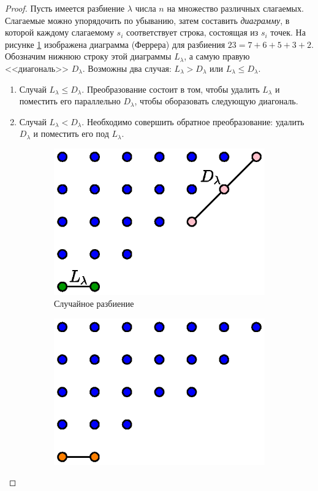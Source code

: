\documentclass[a5paper]{article}
\theoremstyle{definition}
\begin{document}
\begin{proof}
	Пусть имеется разбиение \( \lambda \) числа \( n \) на множество различных 
	слагаемых. 
	Слагаемые можно упорядочить по убыванию, затем составить 
	\textit{диаграмму}, в которой каждому слагаемому \( s_i \) соответствует 
	строка, состоящая из \( s_i \) точек. На рисунке \ref{fig:ferrer_1} 
	изображена диаграмма (Феррера) для разбиения \( 23 = 7+6+5+3+2 \). 
	Обозначим нижнюю строку этой диаграммы \( L_{\lambda} \), а самую правую 
	<<диагональ>> \( D_{\lambda} \). Возможны два случая: \( L_{\lambda} > 
	D_{\lambda} \) или \( L_{\lambda} \leq D_{\lambda} \).
	\begin{enumerate}
	\item Случай \( L_{\lambda} \leq D_{\lambda} \). Преобразование состоит в 
	том, чтобы удалить \( L_{\lambda} \) и поместить его параллельно \( 
	D_{\lambda} \), чтобы оборазовать следующую диагональ.
	\item Случай \( L_{\lambda} < D_{\lambda} \). Необходимо совершить обратное 
	преобразование: удалить \( D_{\lambda} \) и поместить его под \( 
	L_{\lambda} \).
	\end{enumerate}
\begin{figure}[h]
\centering
\begin{subfigure}{.33\textwidth}
	\centering
	\includegraphics[width=.8\textwidth]{ferrer_1}
	\caption{Случайное разбиение}
	\label{fig:ferrer_1}	
\end{subfigure}%
\begin{subfigure}{.33\textwidth}
	\centering
	\includegraphics[width=.7\textwidth]{ferrer_2}

\end{subfigure}
\end{figure}
\end{proof}
\end{document}
